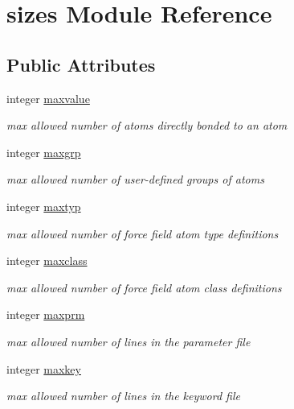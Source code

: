 \hypertarget{classsizes}{\section{sizes Module Reference}
\label{classsizes}
}
\subsection*{Public Attributes}
\begin{DoxyCompactItemize}
\item 
integer \hyperlink{classsizes_a3e950abbb75f8e27bedf94968f7baf7b}{maxvalue}
\begin{DoxyCompactList}\small\item\em max allowed number of atoms directly bonded to an atom \end{DoxyCompactList}\item 
integer \hyperlink{classsizes_ac1a20b194d028ae26605ec39508deaf0}{maxgrp}
\begin{DoxyCompactList}\small\item\em max allowed number of user-\/defined groups of atoms \end{DoxyCompactList}\item 
integer \hyperlink{classsizes_a1f20629ac86c084fead34ed323f36c7b}{maxtyp}
\begin{DoxyCompactList}\small\item\em max allowed number of force field atom type definitions \end{DoxyCompactList}\item 
integer \hyperlink{classsizes_adfda6b1a95ea8e1fe82fec3cddb29d66}{maxclass}
\begin{DoxyCompactList}\small\item\em max allowed number of force field atom class definitions \end{DoxyCompactList}\item 
integer \hyperlink{classsizes_aa6c672f18d75f431f58947d63d9bd470}{maxprm}
\begin{DoxyCompactList}\small\item\em max allowed number of lines in the parameter file \end{DoxyCompactList}\item 
integer \hyperlink{classsizes_a8bd1bf65d886678e4c994f8d94788ea8}{maxkey}
\begin{DoxyCompactList}\small\item\em max allowed number of lines in the keyword file \end{DoxyCompactList}\item 

\end{DoxyCompactItemize}
